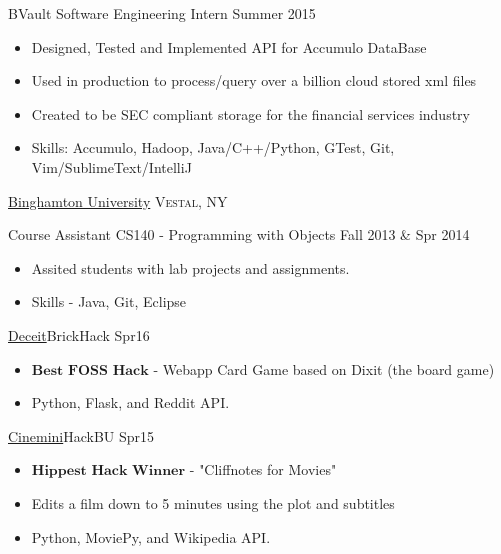 \documentclass[11pt]{article}
\begin{document}
\headedsection  %
{}
{} {
    \headedsubsection
    {BVault Software Engineering Intern}
    {Summer 2015}
    {
        \begin{itemize}
            \item Designed, Tested and Implemented API for Accumulo DataBase
            \item Used in production to process/query over a billion cloud stored xml files
            \item Created to be SEC compliant storage for the financial services industry
            \item Skills: Accumulo, Hadoop, Java/C++/Python, GTest, Git, Vim/SublimeText/IntelliJ
        \end{itemize}
    }
}

\headedsection
{\href{}{Binghamton University}}
{\textsc{Vestal, NY}} {
    \headedsubsection
    {Course Assistant CS140 - Programming with Objects}
    {Fall 2013 \& Spr 2014}
    {
        \begin{itemize}
            \item Assited students with lab projects and assignments.
            \item Skills - Java, Git, Eclipse
        \end{itemize}
    }
}


\spacedhrule{0.1em}{0.5em}  %


\projects
{\href{https://github.com/gabeochoa/sokim}{Deceit}}{BrickHack Spr16}
{
    \begin{itemize}[label={}]
    	\setlength\itemsep{.005ex}
        \item{$\textbf{Best FOSS Hack}$ - Webapp Card Game based on Dixit (the board game)}
        \item{Python, Flask, and Reddit API.}
    \end{itemize}
}

\projects
{\href{https://github.com/gabeochoa/Cinemini}{Cinemini}}{HackBU Spr15}
{
    \begin{itemize}[label={}]
    	\setlength\itemsep{.005ex}
        \item{$\textbf{Hippest Hack Winner}$ - "Cliffnotes for Movies"}
        \item{Edits a film down to 5 minutes using the plot and subtitles}
        \item{Python, MoviePy, and Wikipedia API.}
    \end{itemize}
}
\end{document}
